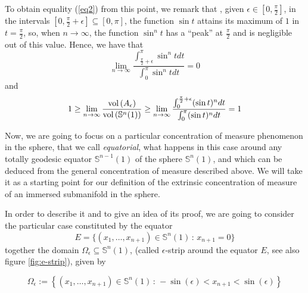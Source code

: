 \documentclass[11pt,letterpaper]{amsart}
\theoremstyle{definition}
\theoremstyle{remark}
\begin{document}
To obtain equality (\ref{eq2}) from this point, we remark that , given $\epsilon \in [0,\frac{\pi}{2}]$,  in the intervals $[0, \frac{\pi}{2}+\epsilon] \subseteq [0,\pi]$, the function $\sin t$ attains its maximum of $1$ in $t=\frac{\pi}{2}$, so, when $n \to \infty$, the function $\sin^n t$ has a ``peak'' at $\frac{\pi}{2}$ and is negligible out of this value. Hence, we have that
\begin{equation}
 \lim_{n \to \infty}\frac{\int_{\frac{\pi}{2}+\epsilon}^{\pi} \sin^n t dt }{\int _0^\pi \sin^n t dt }=0
\end{equation}
\noindent and
\begin{equation}
1\geq \lim_{n \to \infty} \frac{{\rm vol}\left(A_\epsilon\right)}{{\rm vol}\left(\mathbb{S}^n(1)\right)}\geq  \lim_{n \to \infty} \frac{\int _0^{\frac{\pi}{2}+\epsilon} (\sin t)^n dt }{\int _0^\pi (\sin t)^n dt   }=1
\end{equation}
\medskip

Now, we are going to focus on a particular concentration of measure phenomenon in the sphere, that we call {\em equatorial}, what happens in this case around any totally geodesic equator $\mathbb{S}^{n-1}(1)$ of the sphere $ \mathbb{S}^{n}(1)$, and which can be deduced from the general concentration of measure described above. We will take  it as  a starting point for our definition of the extrinsic concentration of measure of an immersed submanifold in the sphere.

In order to describe it and to give an idea of its proof, we are going to consider the particular case constituted by the equator 
$$E=\{(x_1,\ldots,x_{n+1})\in \mathbb{S}^{n}(1)\, :\, x_{n+1}=0\}$$
together the domain $\Omega_\epsilon \subseteq  \mathbb{S}^{n}(1) $, (called $\epsilon$-strip around the equator $E$, see also figure \ref{fig:e-strip}), given by

\begin{equation*}
\Omega_\epsilon:=\left\lbrace  (x_1,\ldots,x_{n+1})\in \mathbb{S}^{n}(1)\, :\, -\sin(\epsilon)<x_{n+1}<\sin(\epsilon)\right\rbrace
\end{equation*}
\end{document}
